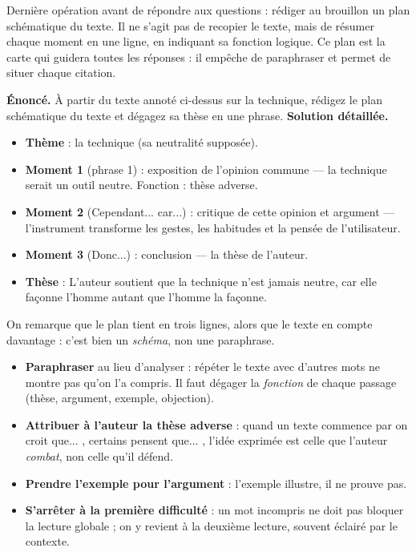 \documentclass[11pt]{article}
\newcommand{\cle}[1]{{\popxbold\color{popdark}#1}}
\newcounter{popsec}
\newcounter{popsub}
\newcommand{\courssub}[1]{%
  \stepcounter{popsub}%
  \par\vspace{9pt}\noindent{\popxbold\fontsize{11.5}{13}\selectfont\color{popink}{\color{poporange}\thepopsec.\thepopsub}\hspace{6pt}#1}\par\nopagebreak\vspace{4pt}
}
\begin{document}
\courssub{Le plan sch\'ematique au brouillon}

Derni\`ere op\'eration avant de r\'epondre aux questions : r\'ediger au brouillon un \cle{plan sch\'ematique} du texte. Il ne s'agit pas de recopier le texte, mais de r\'esumer chaque moment en une ligne, en indiquant sa fonction logique. Ce plan est la carte qui guidera toutes les r\'eponses : il emp\^eche de paraphraser et permet de situer chaque citation.

\begin{exoresolu}
\textbf{\'Enonc\'e.} \`A partir du texte annot\'e ci-dessus sur la technique, r\'edigez le plan sch\'ematique du texte et d\'egagez sa th\`ese en une phrase.
\tcblower
\textbf{Solution d\'etaill\'ee.}
\begin{itemize}
\item \textbf{Th\`eme} : la technique (sa neutralit\'e suppos\'ee).
\item \textbf{Moment 1} (phrase 1) : exposition de l'opinion commune --- la technique serait un outil neutre. Fonction : th\`ese adverse.
\item \textbf{Moment 2} (\og Cependant... car...\fg{}) : critique de cette opinion et argument --- l'instrument transforme les gestes, les habitudes et la pens\'ee de l'utilisateur.
\item \textbf{Moment 3} (\og Donc...\fg{}) : conclusion --- la th\`ese de l'auteur.
\item \textbf{Th\`ese} : \og L'auteur soutient que la technique n'est jamais neutre, car elle façonne l'homme autant que l'homme la façonne. \fg{}
\end{itemize}
On remarque que le plan tient en trois lignes, alors que le texte en compte davantage : c'est bien un \emph{sch\'ema}, non une paraphrase.
\end{exoresolu}

\begin{attention}
\begin{itemize}
\item \textbf{Paraphraser} au lieu d'analyser : r\'ep\'eter le texte avec d'autres mots ne montre pas qu'on l'a compris. Il faut d\'egager la \emph{fonction} de chaque passage (th\`ese, argument, exemple, objection).
\item \textbf{Attribuer \`a l'auteur la th\`ese adverse} : quand un texte commence par \og on croit que... \fg{}, \og certains pensent que... \fg{}, l'id\'ee exprim\'ee est celle que l'auteur \emph{combat}, non celle qu'il d\'efend.
\item \textbf{Prendre l'exemple pour l'argument} : l'exemple illustre, il ne prouve pas.
\item \textbf{S'arr\^eter \`a la premi\`ere difficult\'e} : un mot incompris ne doit pas bloquer la lecture globale ; on y revient \`a la deuxi\`eme lecture, souvent \'eclair\'e par le contexte.
\end{itemize}
\end{attention}
\end{document}
